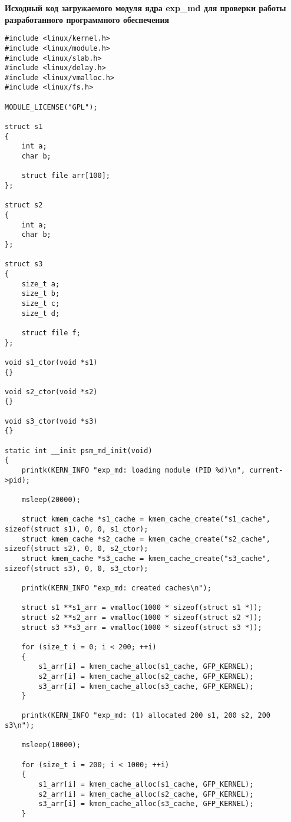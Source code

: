 \begin{center}
	\bfseries{Исходный код загружаемого модуля ядра exp\_md для проверки работы разработанного программного обеспечения}
\end{center}
\begin{lstlisting}
#include <linux/kernel.h>
#include <linux/module.h>
#include <linux/slab.h>
#include <linux/delay.h>
#include <linux/vmalloc.h>
#include <linux/fs.h>

MODULE_LICENSE("GPL");

struct s1
{
	int a;
	char b;
	
	struct file arr[100];
};

struct s2
{
	int a;
	char b;
};

struct s3
{
	size_t a;
	size_t b;
	size_t c;
	size_t d;
	
	struct file f;
};

void s1_ctor(void *s1)
{}

void s2_ctor(void *s2)
{}

void s3_ctor(void *s3)
{}

static int __init psm_md_init(void)
{
	printk(KERN_INFO "exp_md: loading module (PID %d)\n", current->pid);
	
	msleep(20000);
	
	struct kmem_cache *s1_cache = kmem_cache_create("s1_cache", sizeof(struct s1), 0, 0, s1_ctor);
	struct kmem_cache *s2_cache = kmem_cache_create("s2_cache", sizeof(struct s2), 0, 0, s2_ctor);
	struct kmem_cache *s3_cache = kmem_cache_create("s3_cache", sizeof(struct s3), 0, 0, s3_ctor);
	
	printk(KERN_INFO "exp_md: created caches\n");
	
	struct s1 **s1_arr = vmalloc(1000 * sizeof(struct s1 *));
	struct s2 **s2_arr = vmalloc(1000 * sizeof(struct s2 *));
	struct s3 **s3_arr = vmalloc(1000 * sizeof(struct s3 *));
	
	for (size_t i = 0; i < 200; ++i)
	{
		s1_arr[i] = kmem_cache_alloc(s1_cache, GFP_KERNEL);
		s2_arr[i] = kmem_cache_alloc(s2_cache, GFP_KERNEL);
		s3_arr[i] = kmem_cache_alloc(s3_cache, GFP_KERNEL);
	}
	
	printk(KERN_INFO "exp_md: (1) allocated 200 s1, 200 s2, 200 s3\n");
	
	msleep(10000);
	
	for (size_t i = 200; i < 1000; ++i)
	{
		s1_arr[i] = kmem_cache_alloc(s1_cache, GFP_KERNEL);
		s2_arr[i] = kmem_cache_alloc(s2_cache, GFP_KERNEL);
		s3_arr[i] = kmem_cache_alloc(s3_cache, GFP_KERNEL);
	}
	

\end{lstlisting}
